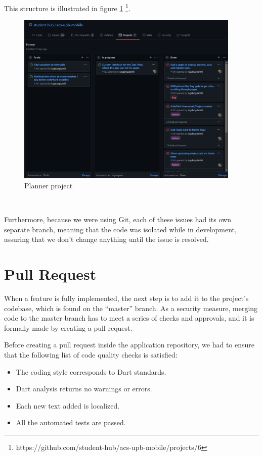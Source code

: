 This structure is illustrated in figure \ref{6:fig:planner} \footnote{https://github.com/student-hub/acs-upb-mobile/projects/6}.

\begin{figure}[ht]
    \centering
         \includegraphics[width=0.95\textwidth]{figures/beforedev/image8.png}
    \caption{Planner project}  
    \label{6:fig:planner}
\end{figure}

~

Furthermore, because we were using Git, each of these issues had its own separate branch, meaning that the code was isolated while in development, assuring that we don’t change anything until the issue is resolved. 

\section{Pull Request} \label{6:pr}


When a feature is fully implemented, the next step is to add it to the project’s codebase, which is found on the “master” branch. As a security measure, merging code to the master branch has to meet a series of checks and approvals, and it is formally made by creating a pull request.

Before creating a pull request inside the application repository, we had to ensure that the following list of code quality checks is satisfied: 
\begin{itemize}
            \setlength{\topsep}{0.5pt}
            \setlength{\itemsep}{0.5pt}
            \setlength{\parsep}{0.5pt}
            \item The coding style corresponds to Dart standards.
            \item Dart analysis returns no warnings or errors.
            \item Each new text added is localized.
            \item All the automated tests are passed.
\end{itemize}

